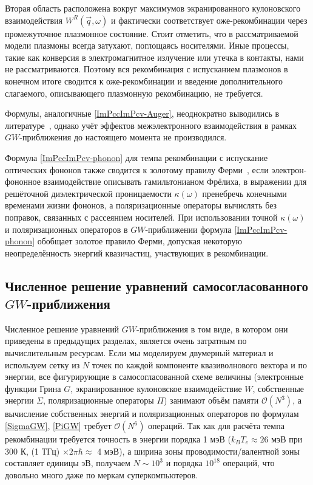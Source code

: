 Вторая область расположена вокруг максимумов экранированного кулоновского взаимодействия $W^{R}(\vec{q}, \omega)$ и фактически соответствует оже-рекомбинации через промежуточное плазмонное состояние. Стоит отметить, что в рассматриваемой модели плазмоны всегда затухают, поглощаясь носителями. Иные процессы, такие как конверсия в электромагнитное излучение или утечка в контакты, нами не рассматриваются. Поэтому вся рекомбинация с испусканием плазмонов в конечном итоге сводится к оже-рекомбинации и введение дополнительного слагаемого, описывающего плазмонную рекомбинацию, не требуется.

Формулы, аналогичные \eqref{ImPccImPcv-Auger}, неоднократно выводились в литературе~\cite{Ziep-Mocker, Yevick-GW_Auger}, однако учёт эффектов межэлектронного взаимодействия в рамках $GW$-приближения до настоящего момента не производился. 

Формула \eqref{ImPccImPcv-phonon} для темпа рекомбинации с испускание оптических фононов также сводится к золотому правилу Ферми~\cite{phonon_through_kappa}, если электрон-фононное взаимодействие описывать гамильтонианом Фрёлиха, в выражении для решёточной диэлектрической проницаемости $\kappa(\omega)$ пренебречь конечными временами жизни фононов, а поляризационные операторы вычислять без поправок, связанных с рассеянием носителей. При использовании точной $\kappa(\omega)$ и поляризационных операторов в $GW$-приближении формула \eqref{ImPccImPcv-phonon} обобщает золотое правило Ферми, допуская некоторую неопределённость энергий квазичастиц, участвующих в рекомбинации.

\subsection{Численное решение уравнений самосогласованного $GW$-приближения} \label{sec:GW-Fourier}
Численное решение уравнений $GW$-приближения в том виде, в котором они приведены в предыдущих разделах, является очень затратным по вычислительным ресурсам. Если мы моделируем двумерный материал и используем сетку из $N$ точек по каждой компоненте квазиволнового вектора и по энергии, все фигурирующие в самосогласованной схеме величины (электронные функции Грина $G$, экранированное кулоновское взаимодействие $W$, собственные энергии $\Sigma$, поляризационные операторы $\Pi$) занимают объём памяти $\mathcal{O}(N^3)$, а вычисление собственных энергий и поляризационных операторов по формулам \eqref{SigmaGW}, \eqref{PiGW} требует $\mathcal{O}(N^6)$ операций. Так как для расчёта темпа рекомбинации требуется точность в энергии порядка 1 мэВ ($k_B T_e \approx 26$ мэВ при 300 К, (1 ТГц) $\times 2\pi \hbar \approx$ 4 мэВ), а ширина зоны проводимости/валентной зоны составляет единицы эВ, получаем $N \sim 10^3$ и порядка $10^{18}$ операций, что довольно много даже по меркам суперкомпьютеров.

